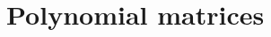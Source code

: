 \section{Polynomial matrices}
\subsection{}
\nosolution

\subsection{}
\nosolution

\subsection{}
\nosolution

\subsection{}
\nosolution
